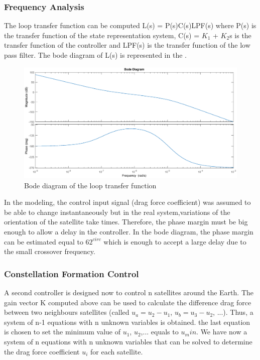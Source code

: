\subsubsection{Frequency Analysis}
The loop transfer function can be computed L(s) = P(s)C(s)LPF(s) where P(s) is the transfer function of the state representation system, C(s) = $K_1$ + $K_2$s is the transfer function of the controller and LPF(s) is the transfer function of the low pass filter.
The bode diagram of L(s) is represented in the . \\
\begin{figure}[H]
	\centering
	\includegraphics[width=0.9\linewidth]
	{figures/Bode_L.eps}
	\caption{Bode diagram of the loop transfer function}
	\label{fig:Bode_L}
\end{figure}
In the modeling, the control input signal (drag force coefficient) was assumed to be able to change instantaneously but in the real system,variations of the orientation of the satellite take times. Therefore, the phase margin must be big enough to allow a delay in the controller. In the bode diagram, the phase margin can be estimated equal to $62^{circ}$ which is enough to accept a large delay due to the small crossover frequency. \\

\subsubsection{Constellation Formation Control} 
A second controller is designed now to control n satellites around the Earth. The gain vector K computed above can be used to calculate the difference drag force between two neighbours satellites (called $u_a = u_2 - u_1$, $u_b = u_3 - u_2$, ...). Thus, a system of n-1 equations with n unknown variables is obtained. the last equation is chosen to set the minimum value of $u_1$, $u_2$,... equals to $u_min$. We have now a system of n equations with n unknown variables that can be solved to determine the drag force coefficient $u_i$ for each satellite.
